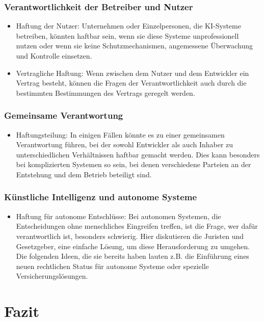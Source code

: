 \documentclass{report}
\begin{document}
\subsection{Verantwortlichkeit der Betreiber und Nutzer}

\begin{itemize}
\item Haftung der Nutzer: Unternehmen oder Einzelpersonen, die KI-Systeme betreiben, könnten haftbar sein, wenn sie diese Systeme unprofessionell nutzen oder wenn sie keine Schutzmechanismen, angemessene Überwachung und Kontrolle einsetzen. 
\item Vertragliche Haftung: Wenn zwischen dem Nutzer und dem Entwickler ein Vertrag besteht, können die Fragen der Verantwortlichkeit auch durch die bestimmten Bestimmungen des Vertrags geregelt werden.
\end{itemize}

\subsection{Gemeinsame Verantwortung}
\begin {itemize}
\item Haftungsteilung: In einigen Fällen könnte es zu einer gemeinsamen Verantwortung führen, bei der sowohl Entwickler als auch Inhaber zu unterschiedlichen Verhältnissen haftbar gemacht werden. Dies kann besonders bei komplizierten Systemen so sein, bei denen verschiedene Parteien an der Entstehung und dem Betrieb beteiligt sind.
\end{itemize}

\subsection{Künstliche Intelligenz und autonome Systeme} 
\begin{itemize}
    \item Haftung für autonome Entschlüsse: Bei autonomen Systemen, die Entscheidungen ohne menschliches Eingreifen treffen, ist die Frage, wer dafür verantwortlich ist, besonders schwierig. Hier diskutieren die Juristen und Gesetzgeber, eine einfache Lösung, um diese Herausforderung zu umgehen. Die folgenden Ideen, die sie bereits haben lauten z.B. die Einführung eines neuen rechtlichen Status für autonome Systeme oder spezielle Versicherungslösungen.
\end{itemize}


\chapter{Fazit}
\end{document}
